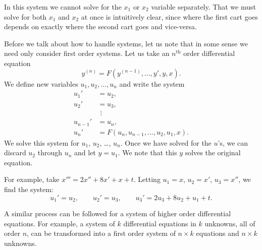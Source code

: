 \documentclass[12pt]{book}
\begin{document}
In this system we cannot solve for the $x_1$ or $x_2$ variable separately.
That we must solve for both $x_1$ and $x_2$ at once
is intuitively clear, since where the first cart goes
depends on exactly where the second cart goes and vice-versa.

\medskip

Before we talk about how to handle systems, let us note that
in some sense
we need only consider first order systems.
Let us
take an $n^{\text{th}}$ order differential equation
\begin{equation*}
y^{(n)} = F(y^{(n-1)},\ldots,y',y,x) .
\end{equation*}
We define new variables $u_1, u_2, \ldots, u_n$ and write the system
\begin{align*}
u_1' & = u_2 , \\
u_2' & = u_3 , \\
& ~\, \vdots \\
u_{n-1}' & = u_n , \\
u_n' & = F(u_n,u_{n-1},\ldots,u_2,u_1,x) .
\end{align*}
We solve
this system for $u_1$, $u_2$, \ldots, $u_n$.  Once we have solved
for the $u$'s,
we can discard $u_2$ through $u_n$ and let $y = u_1$.  We note
that this $y$ solves the original equation.

For example, take $x''' = 2x''+ 8x' + x + t$.  Letting $u_1 = x$, $u_2 = x'$, $u_3
= x''$, we find the system:
\begin{equation*}
u_1' = u_2, \qquad u_2' = u_3, \qquad u_3' = 2u_3 + 8u_2 + u_1 + t .
\end{equation*}

A similar process can be followed for a system of higher order differential
equations.  For example, a system of $k$ differential equations in $k$
unknowns, all of order $n$, can be transformed into a first
order system of $n \times k$
equations and $n \times k$ unknowns.
\end{document}
